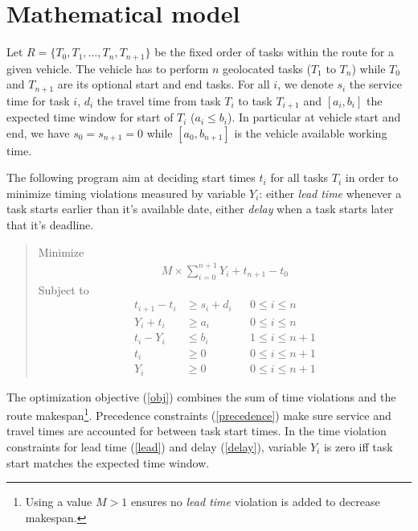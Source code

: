\documentclass{article}
\begin{document}
\section{Mathematical model}

Let $R=\{T_0, T_1, \ldots, T_n, T_{n + 1}\}$ be the fixed order of
tasks within the route for a given vehicle. The vehicle has to perform
$n$ geolocated tasks ($T_1$ to $T_n$) while $T_0$ and $T_{n + 1}$ are
its optional start and end tasks. For all $i$, we denote $s_i$ the
service time for task $i$, $d_i$ the travel time from task $T_i$ to
task $T_{i + 1}$ and $[a_i, b_i]$ the expected time window for start
of $T_i$ ($a_i \leq b_i$). In particular at vehicle start and end, we
have $s_0 = s_{n + 1} = 0$ while $[a_0, b_{n + 1}]$ is the vehicle
available working time.

The following program aim at deciding start times $t_i$ for all tasks
$T_i$ in order to minimize timing violations measured by variable
$Y_i$: either \textit{lead time} whenever a task starts earlier than
it's available date, either \textit{delay} when a task starts later
that it's deadline.


\begin{quote}
  Minimize
  \begin{align}
    M \times \sum_{i = 0}^{n + 1} Y_i + t_{n +1} - t_0 \label{obj}\tag{Obj}
  \end{align}
  Subject to
  \begin{align}
    t_{i + 1} - t_i &\geq s_i + d_i && 0 \leq i \leq n\label{precedence}\tag{$P_i$}\\
    Y_i + t_i &\geq a_i && 0 \leq i \leq n \label{lead}\tag{$L_i$}\\
    t_i - Y_i &\leq b_i && 1 \leq i \leq n + 1 \label{delay}\tag{$D_i$}\\
    t_i &\geq 0 && 0 \leq i \leq n + 1 \nonumber\\
    Y_i &\geq 0 && 0 \leq i \leq n + 1 \nonumber
  \end{align}
\end{quote}

The optimization objective (\ref{obj}) combines the sum of time
violations and the route makespan\footnote{Using a value $M > 1$
  ensures no \textit{lead time} violation is added to decrease
  makespan.}. Precedence constraints (\ref{precedence}) make sure
service and travel times are accounted for between task start
times. In the time violation constraints for lead time (\ref{lead})
and delay (\ref{delay}), variable $Y_i$ is zero iff task start matches
the expected time window.
\end{document}
